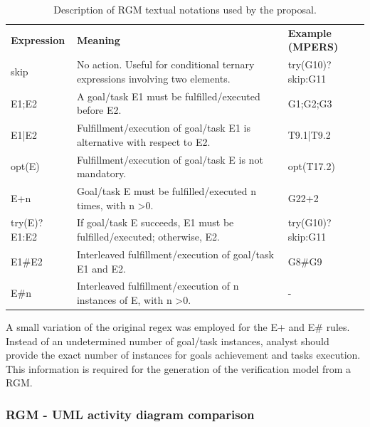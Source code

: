 \begin{table}[h]
{\renewcommand{\arraystretch}{1.5}
\begin{tabularx}{\textwidth}{@{}l|X|X@{}}
\toprule
\textbf{Expression} & \textbf{Meaning}                                                                   & \textbf{Example (MPERS)} \\ 
skip                & No action. Useful for conditional ternary expressions involving two elements.      & try(G10)?skip:G11        \\ 
E1;E2               & A goal/task E1 must be fulfilled/executed before E2.                               & G1;G2;G3                 \\ 
E1|E2               & Fulfillment/execution of goal/task E1 is alternative with respect to E2. & T9.1|T9.2                \\ 
opt(E)              & Fulfillment/execution of goal/task E is not mandatory.                             & opt(T17.2)               \\ 
E+n                 & Goal/task E must be fulfilled/executed n times, with n \textgreater 0.             & G22+2                    \\ 
try(E)?E1:E2        & If goal/task E succeeds, E1 must be fulfilled/executed; otherwise, E2.             & try(G10)?skip:G11        \\ 
E1\#E2              & Interleaved fulfillment/execution of goal/task E1 and E2.                          & G8\#G9                   \\ 
E\#n                & Interleaved fulfillment/execution of n instances of E, with n \textgreater 0.      & -                        \\ \bottomrule
\end{tabularx}
}
\caption{Description of RGM textual notations used by the proposal.}
\label{tab:RGM_REGEX}
\end{table}

A small variation of the original regex was employed for the E+ and E\# rules. Instead of an undetermined number of goal/task instances, analyst should provide the exact number of instances for goals achievement and tasks execution. This information is required for the generation of the verification model from a RGM.

\subsubsection{RGM - UML activity diagram comparison}\label{ssec:RGM-UML}

